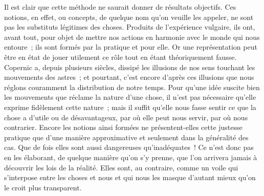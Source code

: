 \documentclass[french,twoside]{book} %
\begin{document}
Il est clair que cette méthode ne saurait donner de résultats objectifs. Ces notions, en effet, ou concepts, de quelque nom qu’on veuille les appeler, ne sont pas les substituts légitimes des choses. Produits de l’expérience vulgaire, ils ont, avant tout, pour objet de mettre nos actions en harmonie avec le monde qui nous entoure ; ils sont formés par la pratique et pour elle. Or une représentation peut être en état de jouer utilement ce rôle tout en étant théoriquement fausse. Copernic a, depuis plusieurs siècles, dissipé les illusions de nos sens touchant les mouvements des astres ; et pourtant, c’est encore d’après ces illusions que nous réglons couramment la distribution de notre temps. Pour qu’une idée suscite bien les mouvements que réclame la nature d’une chose, il n’est pas nécessaire qu’elle exprime fidèlement cette nature ; mais il suffit qu’elle nous fasse sentir ce que la chose a d’utile ou de désavantageux, par où elle peut nous servir, par où nous contrarier. Encore les notions ainsi formées ne présentent-elles cette justesse pratique que d’une manière approximative et seulement dans la généralité des cas. Que de fois elles sont aussi dangereuses qu’inadéquates ! Ce n’est donc pas en les élaborant, de quelque manière qu’on s’y prenne, que l’on arrivera jamais à découvrir les lois de la réalité. Elles sont, au contraire, comme un voile qui s’interpose entre les choses et nous et qui nous les masque d’autant mieux qu’on le croit plus transparent.\par
\end{document}
